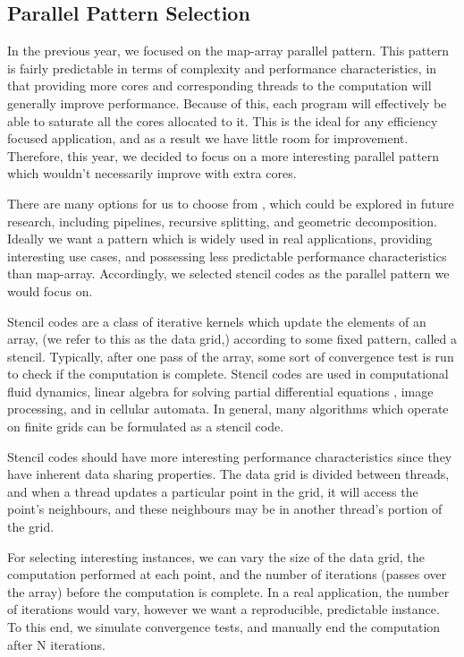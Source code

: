 \subsection{Parallel Pattern Selection}
\label{section:design:parallel_pattern_selection}

In the previous year, we focused on the map-array parallel pattern. This pattern is fairly predictable in terms of complexity and performance characteristics, in that providing more cores and corresponding threads to the computation will generally improve performance. Because of this, each program will effectively be able to saturate all the cores allocated to it. This is the ideal for any efficiency focused application, and as a result we have little room for improvement. Therefore, this year, we decided to focus on a more interesting parallel pattern which wouldn't necessarily improve with extra cores.

There are many options for us to choose from \cite{parallel_patterns_examples1} \cite{parallel_patterns_examples2}, which could be explored in future research, including pipelines, recursive splitting, and geometric decomposition. Ideally we want a pattern which is widely used in real applications, providing interesting use cases, and possessing less predictable performance characteristics than map-array. Accordingly, we selected stencil codes as the parallel pattern we would focus on.

Stencil codes are a class of iterative kernels which update the elements of an array, (we refer to this as the data grid,) according to some fixed pattern, called a stencil. Typically, after one pass of the array, some sort of convergence test is run to check if the computation is complete. Stencil codes are used in computational fluid dynamics, linear algebra for solving partial differential equations \cite{yang_mittal_2014} \cite{anzt_dongarra_quintana-ort_2015} \cite{wang_2015}, image processing, and in cellular automata. In general, many algorithms which operate on finite grids can be formulated as a stencil code.
 
Stencil codes should have more interesting performance characteristics since they have inherent data sharing properties. The data grid is divided between threads, and when a thread updates a particular point in the grid, it will access the point's neighbours, and these neighbours may be in another thread's portion of the grid.
 
For selecting interesting instances, we can vary the size of the data grid, the computation performed at each point, and the number of iterations (passes over the array) before the computation is complete. In a real application, the number of iterations would vary, however we want a reproducible, predictable instance. To this end, we simulate convergence tests, and manually end the computation after N iterations.



